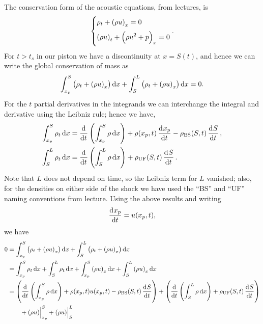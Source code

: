 \documentclass{article}
\newcommand{\bs}{\text{BS}}
\newcommand{\uf}{\text{UF}}
\begin{document}
The conservation form of the acoustic equations, from lectures, is
%
\begin{equation*}
    \begin{dcases}
        \rho_t + \del{\rho u}_x = 0 \\[2pt]
        \del{\rho u }_t + \del{\rho u^2 + p}_x = 0
    \end{dcases}
    .
\end{equation*}
%
For $t > t_s$ in our piston we have a discontinuity at $x = S(t)$, and
hence we can write the global conservation of mass as
%
\begin{equation*}
    \int_{x_p}^S \del{\rho_t + \del{\rho u}_x} \dif x
        + \int_{S}^L \del{\rho_t + \del{\rho u}_x} \dif x
        = 0
        .
\end{equation*}
%
For the $t$ partial derivatives in the integrands we can interchange the
integral and derivative using the Leibniz rule; hence we have,
%
\begin{align*}
    \int_{x_p}^S \rho_t \dif x
        &= \dod{}{t} \del{\int_{x_p}^S \rho \dif x}
            + \rho(x_p, t) \dod{x_p}{t}
            - \rho_\bs(S, t) \dod{S}{t}
            ,
    \\
    \int_S^L \rho_t \dif x
        &= \dod{}{t} \del{\int_S^L \rho \dif x}
            + \rho_\uf(S, t) \dod{S}{t}
            .
\end{align*}
%
Note that $L$ does not depend on time, so the Leibniz term for $L$
vanished; also, for the densities on either side of the shock we have
used the ``BS'' and ``UF'' naming conventions from lecture. Using the
above results and writing
%
\begin{equation*}
    \dod{x_p}{t} = u(x_p, t)
    ,
\end{equation*}
%
we have
%
\begin{align*}
    0 &= \int_{x_p}^S \del{\rho_t + \del{\rho u}_x} \dif x
        + \int_{S}^L \del{\rho_t + \del{\rho u}_x} \dif x
    \\
    &=
    \int_{x_p}^S \rho_t \dif x
        + \int_{S}^L \rho_t \dif x
        + \int_{x_p}^S \del{\rho u}_x \dif x
        + \int_{S}^L \del{\rho u}_x \dif x
    \\
    &=
    \del{
        \dod{}{t} \del{\int_{x_p}^S \rho \dif x}
        + \rho(x_p, t) u(x_p, t)
        - \rho_\bs(S, t) \dod{S}{t}
    }
    + \del{
        \dod{}{t} \del{\int_S^L \rho \dif x}
        + \rho_\uf(S, t) \dod{S}{t}
    }
    \\
    &\qquad
    + \eval[2]{\del{\rho u}}_{x_p}^S
        + \eval[2]{\del{\rho u}}_{S}^L
\end{align*}
\end{document}
